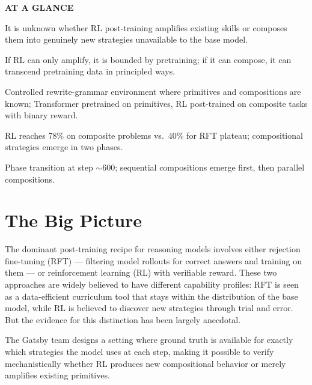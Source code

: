 \documentclass[10pt,twocolumn]{article}
\begin{document}
\begin{mdframed}[backgroundcolor=boxgray,linecolor=rulered,linewidth=1pt,
    innerleftmargin=6pt,innerrightmargin=6pt,
    innertopmargin=6pt,innerbottommargin=6pt]
\textbf{\small AT A GLANCE}\par\vspace{4pt}
\begin{description}[leftmargin=0pt,labelsep=4pt,itemsep=2pt,parsep=0pt,
    font=\small\bfseries]
  \item[Problem:] It is unknown whether RL post-training amplifies
    existing skills or composes them into genuinely new strategies
    unavailable to the base model.
  \item[Why it matters:] If RL can only amplify, it is bounded by
    pretraining; if it can compose, it can transcend pretraining
    data in principled ways.
  \item[Method:] Controlled rewrite-grammar environment where
    primitives and compositions are known; Transformer pretrained
    on primitives, RL post-trained on composite tasks with binary reward.
  \item[Result:] RL reaches 78\% on composite problems vs.\ 40\% for
    RFT plateau; compositional strategies emerge in two phases.
  \item[Evidence:] Phase transition at step $\sim$600; sequential
    compositions emerge first, then parallel compositions.
\end{description}
\end{mdframed}

\section{The Big Picture}

The dominant post-training recipe for reasoning models involves
either rejection fine-tuning (RFT) --- filtering model rollouts for
correct answers and training on them --- or reinforcement learning
(RL) with verifiable reward.
These two approaches are widely believed to have different capability
profiles: RFT is seen as a data-efficient curriculum tool that
stays within the distribution of the base model, while RL is
believed to discover new strategies through trial and error.
But the evidence for this distinction has been largely anecdotal.

The Gatsby team designs a setting where ground truth is available
for exactly which strategies the model uses at each step, making it
possible to verify mechanistically whether RL produces new
compositional behavior or merely amplifies existing primitives.
\end{document}
